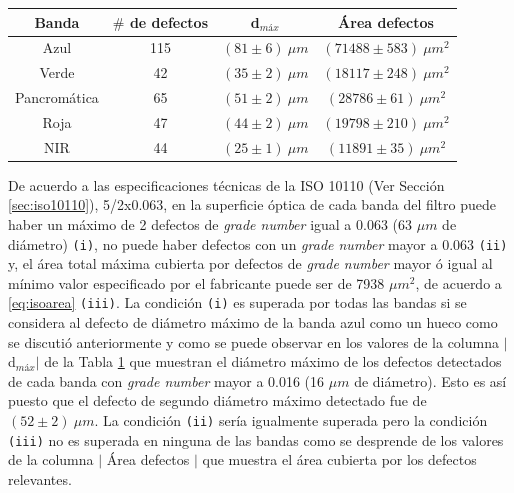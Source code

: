 \begin{table}[H]
\begin{center}
\begin{tabular}{ |c|c|c|c| }    \toprule
Banda & $\#$ de defectos & d$_{máx}$ & Área defectos\\\midrule
\rowcolor{blue!15} Azul    & 115 & $(81 \pm 6)~\mu m$ & $(71488 \pm 583)~\mu m^{2}$   \\ 
\rowcolor{green!50} Verde  & 42 &  $(35 \pm 2)~\mu m$ &  $(18117 \pm 248)~ \mu m^{2}$\\ 
Pancromática& 65 & $(51 \pm 2)~\mu m$ & $(28786 \pm 61)~\mu m^{2}$  \\
\rowcolor{red!50} Roja & 47 &  $(44 \pm 2)~\mu m$ &   $(19798 \pm 210 )~\mu m^{2}$ \\
\rowcolor{maroon!20} NIR & 44 & $(25 \pm 1)~ \mu m$  & $(11891 \pm 35 )~\mu m^{2}$ \\
\bottomrule
 \hline
\end{tabular}
\end{center}
 \label{tabISO}
\end{table}

De acuerdo a las especificaciones técnicas de la ISO 10110 (Ver Sección \ref{sec:iso10110}), 5/2x0.063,  en la superficie óptica de cada banda del filtro puede haber un máximo de 2 defectos de \textit{grade number} igual a 0.063 (63 $\mu m$ de diámetro) \texttt{(i)}, no puede haber defectos con un \textit{grade number} mayor a 0.063 \texttt{(ii)} y, el área total máxima cubierta por defectos de \textit{grade number} mayor ó igual al mínimo valor especificado por el fabricante puede ser de 7938 $\mu m^{2}$, de acuerdo a \ref{eq:isoarea} \texttt{(iii)}. La condición \texttt{(i)} es superada por todas las bandas si se considera al defecto de diámetro máximo de la banda azul como un hueco como se discutió anteriormente y como se puede observar en los valores de la columna $|$d$_{máx}$$|$ de la Tabla \ref{tabISO} que muestran el diámetro máximo de los defectos detectados de cada banda con \textit{grade number} mayor a 0.016 (16 $\mu m$ de diámetro). Esto es así puesto que el defecto de segundo diámetro máximo detectado fue de $(52 \pm 2)~ \mu m$. La condición \texttt{(ii)} sería igualmente superada pero la condición \texttt{(iii)} no es superada en ninguna de las bandas como se desprende de los valores de la columna $|$ Área defectos $|$  que muestra el área cubierta por los defectos relevantes.

